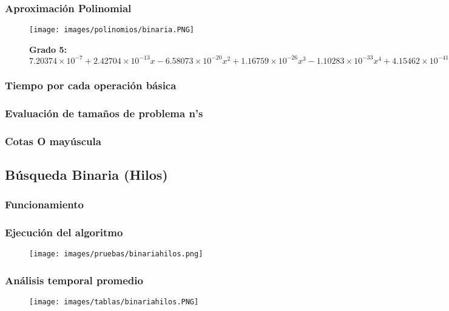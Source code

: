 \documentclass[12pt]{article}
\begin{document}
			\subsubsection{Aproximación Polinomial}
				\begin{figure}[H]
			    	   \centering
			    	   \texttt{[image: images/polinomios/binaria.PNG]}
			    	   \caption*{\textbf{Grado 5: $7.20374\times10^{-7} + 2.42704\times10^{-13} x - 6.58073\times10^{-20} x^2 + 
			            1.16759\times10^{-26} x^3 - 1.10283\times10^{-33} x^4 + 4.15462\times10^{-41} x^5$}}
			    \end{figure}
			
			\subsubsection{Tiempo por cada operación básica}
			
			\subsubsection{Evaluación de tamaños de problema n's}
			
			\subsubsection{Cotas O mayúscula}
				
\newpage

		\subsection{Búsqueda Binaria (Hilos)}
			
			\subsubsection{Funcionamiento}
			
			\subsubsection{Ejecución del algoritmo}
				\begin{figure}[H]
			    	   \centering
			    	   \texttt{[image: images/pruebas/binariahilos.png]}
			    \end{figure}
			
			\subsubsection{Análisis temporal promedio}
				\begin{figure}[H]
			    	   \centering
			    	   \texttt{[image: images/tablas/binariahilos.PNG]}
			    \end{figure}
			
\end{document}
